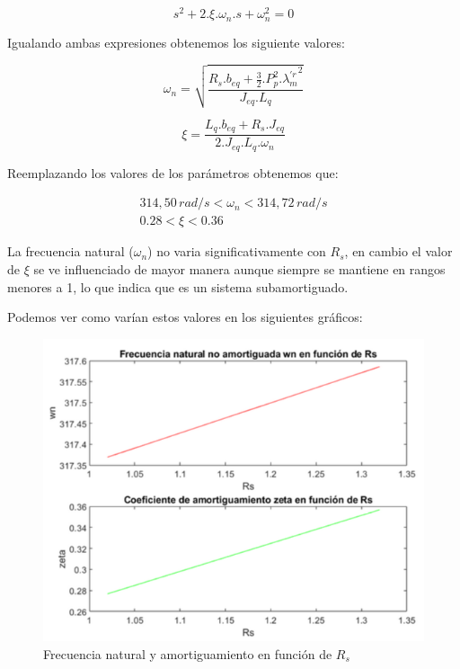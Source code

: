 \documentclass{article}
\begin{document}
\begin{equation}
    s^2 + 2.\xi.\omega_n.s + \omega_n^2 = 0
\end{equation}

Igualando ambas expresiones obtenemos los siguiente valores:

\begin{equation}
    \omega_n = \sqrt{\frac{R_s.b_{eq} + \frac{3}{2}.P_p^2.{\lambda_m^{\prime r}}^2}{J_{eq}.L_q}}
\end{equation}

\begin{equation}
    \xi = \frac{L_q.b_{eq} + R_s.J_{eq}}{2.J_{eq}.L_q.\omega_n}
\end{equation}


Reemplazando los valores de los parámetros obtenemos que:

\begin{equation*}\begin{aligned}
    314,50\,rad/s < \omega_n < 314,72\,rad/s \\
    0.28 < \xi < 0.36 \quad\quad\quad\quad
\end{aligned}\end{equation*}

La frecuencia natural ($\omega_n$) no varia significativamente con $R_s$, en cambio el valor de $\xi$
se ve influenciado de mayor manera aunque siempre se mantiene en rangos menores a 1, lo que 
indica que es un sistema subamortiguado.

Podemos ver como varían estos valores en los siguientes gráficos:

\begin{figure}[H]
    \centering
    \includegraphics{frecuancia_amortiguamiento_rs.png}
    \caption{Frecuencia natural y amortiguamiento en función de $R_s$}
\end{figure}
\end{document}
